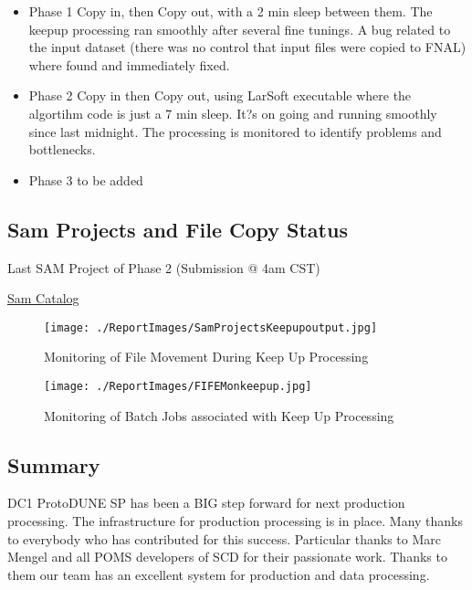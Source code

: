 \documentclass[pdftex,12pt,letter]{article}
\begin{document}
\begin{itemize}
\item Phase 1 
Copy in, then Copy out, with a 2 min sleep between them.
The keepup processing ran smoothly after several fine tunings.
A bug related to the input dataset (there was no control that input files were copied to FNAL) where found and immediately fixed.

\item Phase 2 
Copy in then  Copy out, using LarSoft executable where the algortihm code is just a 7 min sleep. It?s on going and running smoothly since last midnight.
The processing is monitored to identify problems and bottlenecks.

\item Phase 3
\color{red} to be added
\color{black}

\end{itemize}

\subsection {Sam Projects and File Copy Status}
Last SAM Project of Phase 2 (Submission @ 4am CST)

\href{http://samweb.fnal.gov:8480/station_monitor/dune/stations/dune/projects/dunepro-null_lar.sh_20171110_040116_3425472}{Sam Catalog}



\begin{figure}[tbh]
  \centering
  \texttt{[image: ./ReportImages/SamProjectsKeepupoutput.jpg]}
  \caption{Monitoring of File Movement During Keep Up Processing}
  \label{fig:FTSKeepUPProcessing}
\end{figure}



\begin{figure}[tbh]
  \centering
  \texttt{[image: ./ReportImages/FIFEMonkeepup.jpg]}
  \caption{Monitoring of Batch Jobs associated with Keep Up Processing}
  \label{fig:FIFEmon}
\end{figure}



\subsection {Summary}

DC1 ProtoDUNE SP has been a BIG step forward for next production processing.
The infrastructure for production processing is in place.
Many thanks to everybody who has contributed for this success.
Particular thanks to Marc Mengel and all POMS developers of SCD for their passionate work. Thanks to them our team has an excellent system for production and data processing.
\end{document}
